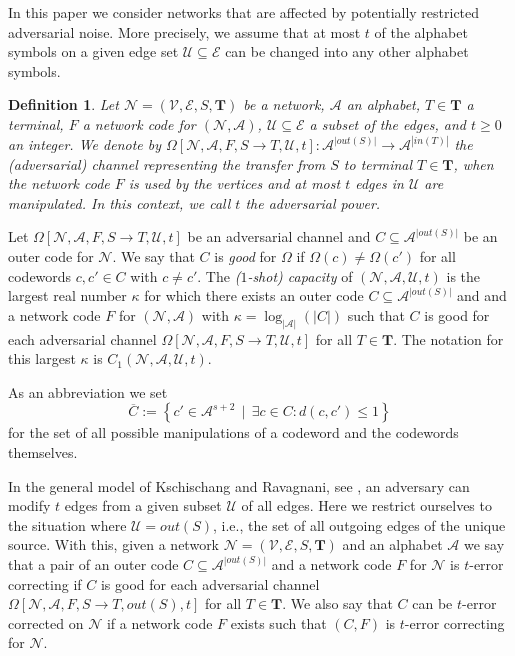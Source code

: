 \documentclass[11pt]{article}
\newcommand{\cA}{\mathcal{A}}
\newcommand{\cE}{\mathcal{E}}
\newcommand{\cN}{\mathcal{N}}
\newcommand{\cU}{\mathcal{U}}
\newcommand{\cV}{\mathcal{V}}
\newtheorem{definition}[theorem]{Definition}
\begin{document}
In this paper we consider networks that are affected by potentially restricted adversarial noise. More precisely, we assume that at most 
$t$ of the alphabet symbols on a given edge set $\cU \subseteq \cE$ can be changed into any other alphabet symbols. 

\begin{definition}
  Let $\cN=(\cV,\cE,S,\mathbf{T})$ be a network, $\cA$ an alphabet, $T \in \mathbf{T}$ a terminal, $F$ a
  network code for $(\cN , \cA)$, $\cU \subseteq \cE$ a subset of the edges, and $t \ge 0$ an integer. We denote by
  $\Omega[\cN , \cA, F, S \to T, \cU, t] \colon \cA^{|out(S)|}\to \cA^{|in(T)|}$ the (adversarial) \emph{channel} representing the transfer 
  from $S$ to terminal $T \in \mathbf{T}$, when the network code $F$ is used by the vertices and at most $t$ edges 
  in $\cU$ are manipulated. In this context, we call $t$ the \emph{adversarial power}.
\end{definition}

Let $\Omega[\cN , \cA, F, S \to T, \cU, t]$ be an adversarial channel and $C\subseteq \cA^{|out(S)|}$ be an outer code for $\cN$. We say that $C$ is 
\emph{good} for $\Omega$ if $\Omega(c)\neq \Omega(c')$ for all codewords $c,c'\in C$ with $c\neq c'$. The \emph{($1$-shot) capacity} of $(\cN , \cA, \cU, t)$ 
is the largest real number $\kappa$ for which there exists an outer code $C\subseteq \cA^{|out(S)|}$ and and a network code $F$ for $(\cN , \cA)$ with 
$\kappa = \log_{|\cA|}(|C|)$ such that $C$ is good for each adversarial channel $\Omega[\cN , \cA, F, S \to T, \cU, t]$ for all $T \in \mathbf{T}$. 
The notation for this largest $\kappa$ is $C_1(\cN , \cA, \cU, t)$.

As an abbreviation we set
\begin{equation}
  \overline{C}:= \left\{ c'\in\cA^{s+2}\,\mid\, \exists c\in C: d(c,c')\le 1\right\}
\end{equation}
for the set of all possible manipulations of a codeword and the codewords themselves.

\medskip

In the general model of Kschischang and Ravagnani, see \cite{ravagnani2018adversarial}, an adversary can modify $t$ edges from a given subset $\cU$ of all edges. 
Here we restrict ourselves to the situation where $\cU=out(S)$, i.e., the set of all outgoing edges of the unique source. With this,
given a network $\cN=(\cV,\cE,S,\mathbf{T})$ and an alphabet $\cA$ we say that a pair of an outer code $C\subseteq \cA^{|out(S)|}$ and a network code $F$ for $\cN$ is $t$-error correcting 
if $C$ is good for each adversarial channel $\Omega[\cN , \cA, F, S \to T, out(S), t]$ for all $T \in \mathbf{T}$. We also say that $C$ can be $t$-error 
corrected on $\cN$ if a network code $F$ exists such that $(C,F)$ is $t$-error correcting for $\cN$.  
\end{document}
